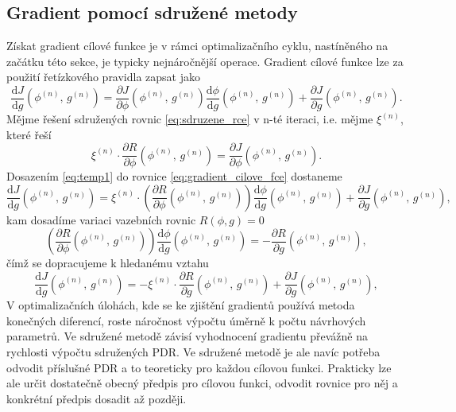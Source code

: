 \subsection{Gradient pomocí sdružené metody}
Získat gradient cílové funkce je v rámci optimalizačního cyklu, nastíněného na začátku této sekce, je typicky nejnáročnější operace. Gradient cílové funkce lze za použití řetízkového pravidla zapsat jako
\begin{equation}\label{eq:gradient_cilove_fce}
\dfrac
{\mathrm{d}J}
{\mathrm{d}g} (\phi^{(n)}, \, g^{(n)})
=
\dfrac
{\partial J}
{\partial \phi }(\phi^{(n)}, \, g^{(n)})
\dfrac
{\mathrm{d}\phi}
{\mathrm{d}g}(\phi^{(n)}, \, g^{(n)})
+
\dfrac
{\partial J}
{\partial g}(\phi^{(n)}, \, g^{(n)}).
\end{equation}
Mějme řešení sdružených rovnic \ref{eq:sdruzene_rce} v n-té iteraci, i.e. mějme $ \xi^{(n)} $, které řeší
\begin{equation}\label{eq:temp1}
\xi^{(n)} \cdot \dfrac{\partial R}{\partial \phi} (\phi^{(n)}, \, g^{(n)})=\dfrac{\partial J}{\partial \phi}(\phi^{(n)}, \, g^{(n)}).
\end{equation}
Dosazením \ref{eq:temp1} do rovnice \ref{eq:gradient_cilove_fce} dostaneme 
\begin{equation*}
\dfrac{\mathrm{d}J}
{\mathrm{d}g} (\phi^{(n)}, \, g^{(n)})
=
\xi^{(n)} 
\cdot 
\left(
\dfrac{\partial R}
{\partial \phi}(\phi^{(n)}, \, g^{(n)})
\right)
\dfrac{\mathrm{d}\phi}
{\mathrm{d}g}(\phi^{(n)}, \, g^{(n)})
+
\dfrac{\partial J}
{\partial g}(\phi^{(n)}, \, g^{(n)}),
\end{equation*}
kam dosadíme variaci vazebních rovnic $ R(\phi,g)=0 $
\begin{equation*}
\left(
\dfrac{\partial R}
{\partial \phi}(\phi^{(n)}, \, g^{(n)})
\right)
\dfrac{\mathrm{d}\phi}
{\mathrm{d}g}(\phi^{(n)}, \, g^{(n)})
=
-\dfrac{\partial R}
{\partial g}(\phi^{(n)}, \, g^{(n)}),
\end{equation*}
čímž se dopracujeme k hledanému vztahu
\begin{equation*}
\dfrac{\mathrm{d}J}
{\mathrm{d}g} (\phi^{(n)}, \, g^{(n)})
=
-\xi^{(n)} 
\cdot 
\dfrac{\partial R}
{\partial g}(\phi^{(n)}, \, g^{(n)})
+
\dfrac{\partial J}
{\partial g}(\phi^{(n)}, \, g^{(n)}),
\end{equation*}
V optimalizačních úlohách, kde se ke zjištění gradientů používá metoda konečných diferencí, roste náročnost výpočtu úměrně k počtu návrhových parametrů. Ve sdružené metodě závisí vyhodnocení gradientu převážně na rychlosti výpočtu sdružených PDR. Ve sdružené metodě je ale navíc potřeba odvodit příslušné PDR a to teoreticky pro každou cílovou funkci. Prakticky lze ale určit dostatečně obecný předpis pro cílovou funkci, odvodit rovnice pro něj a konkrétní předpis dosadit až později.

